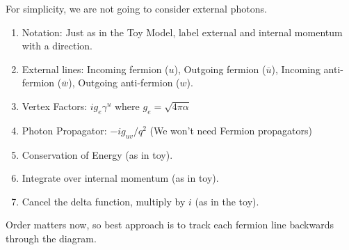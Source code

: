 \documentclass[12pt]{book}
\begin{document}
For simplicity, we are not going to consider external photons.  
\begin{enumerate}
\item Notation:  Just as in the Toy Model, label external and internal momentum with a direction.
\item External lines: Incoming fermion ($u$), Outgoing fermion ($\overline{u}$), 
Incoming anti-fermion ($\overline{w}$), Outgoing anti-fermion ($w$).
\item Vertex Factors:  $i g_e \gamma^u$ where $g_e = \sqrt{4\pi \alpha}$
\item Photon Propagator:  $-ig_{uv}/q^2$  (We won't need Fermion propagators)
\item Conservation of Energy (as in toy).
\item Integrate over internal momentum (as in toy).
\item Cancel the delta function, multiply by $i$ (as in the toy).
\end{enumerate}
Order matters now, so best approach is to track each fermion line backwards through the diagram.
\end{document}
